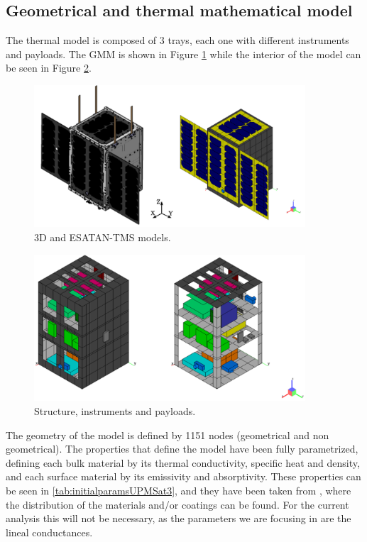 \subsection{Geometrical and thermal mathematical model}
The thermal model is composed of 3 trays, each one with different instruments and payloads.  The GMM is shown in Figure \ref{fig:UPMSat3-GMM} while the interior of the model can be seen in  Figure \ref{fig:UPMSat3-Str-Inst-PL}.
\begin{figure}[H]
    \centering
    \includegraphics[width = 0.9\textwidth]{Figures/UPMSat3/3DandESATAN-TNSmodel.png}
    \caption{3D and ESATAN-TMS models.}
    \label{fig:UPMSat3-GMM}
\end{figure}
\begin{figure}[H]
    \centering
    \includegraphics[width = 0.9\textwidth]{Figures/UPMSat3/str-inst-PL ESATANmodels.png}
    \caption{Structure, instruments and payloads.}
    \label{fig:UPMSat3-Str-Inst-PL}
\end{figure}

The geometry of the model is defined by 1151 nodes (geometrical and non geometrical). The properties that define the model have been fully parametrized, defining each bulk material by its thermal conductivity, specific heat and density, and each surface material by its emissivity and absorptivity. These properties can be seen in \autoref{tab:initialparamsUPMSat3}, and they have been taken from \cite{Sergio}, where the distribution of the materials and/or coatings can be found. For the current analysis this will not be necessary, as the parameters we are focusing in are the lineal conductances. 
